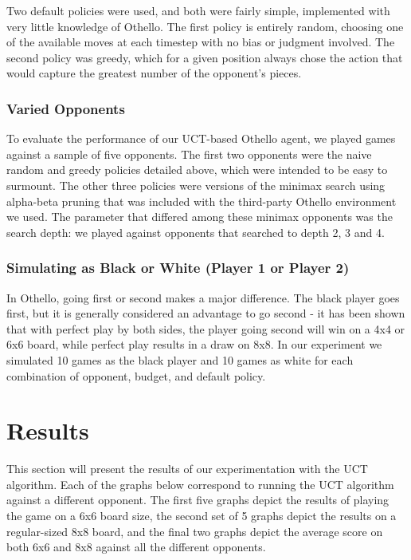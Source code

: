 \documentclass[12pt,letterpaper]{article}
\begin{document}
Two default policies were used, and both were fairly simple, implemented with very little knowledge of Othello. The first policy is entirely random, choosing one of the available moves at each timestep with no bias or judgment involved. The second policy was greedy, which for a given position always chose the action that would capture the greatest number of the opponent's pieces.

\subsubsection{Varied Opponents}
To evaluate the performance of our UCT-based Othello agent, we played games against a sample of five opponents. The first two opponents were the naive random and greedy policies detailed above, which were intended to be easy to surmount. The other three policies were versions of the minimax search using alpha-beta pruning that was included with the third-party Othello environment we used. The parameter that differed among these minimax opponents was the search depth: we played against opponents that searched to depth 2, 3 and 4.

\subsubsection{Simulating as Black or White (Player 1 or Player 2)}
In Othello, going first or second makes a major difference. The black player goes first, but it is generally considered an advantage to go second - it has been shown that with perfect play by both sides, the player going second will win on a 4x4 or 6x6 board, while perfect play results in a draw on 8x8. In our experiment we simulated 10 games as the black player and 10 games as white for each combination of opponent, budget, and default policy.

\section{Results}
\label{results}

This section will present the results of our experimentation with the UCT algorithm. Each of the graphs below correspond to running the UCT algorithm against a different opponent.  The first five graphs depict the results of playing the game on a 6x6 board size, the second set of 5 graphs depict the results on a regular-sized 8x8 board, and the final two graphs depict the average score on both 6x6 and 8x8 against all the different opponents.
\end{document}
